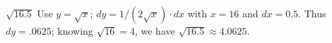 {$\sqrt{16.5}$
}
{Use $y = \sqrt{x}$; $dy = 1/(2\sqrt{x})\cdot dx$ with $x=16$ and $dx = 0.5$. Thus $dy = .0625$; knowing $\sqrt{16}=4$, we have $\sqrt{16.5} \approx 4.0625$.
}

